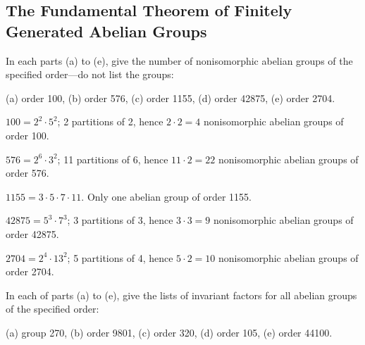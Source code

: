 \newpage

\subsection{The Fundamental Theorem of Finitely Generated Abelian Groups}

\begin{exercise}\label{ex5.2.1}
    In each parts (a) to (e), give the number of nonisomorphic abelian groups of the specified order---do not list the groups:

    \noindent (a) order 100, \quad (b) order 576, \quad (c) order 1155, \quad (d) order 42875, \quad (e) order 2704.
\end{exercise}

\begin{solalph}
    \item $100 = 2^2 \cdot 5^2$; 2 partitions of 2, hence $2 \cdot 2 = 4$ nonisomorphic abelian groups of order 100.
    \item $576 = 2^6 \cdot 3^2$; 11 partitions of 6, hence $11 \cdot 2 = 22$ nonisomorphic abelian groups of order 576.
    \item $1155 = 3 \cdot 5 \cdot 7 \cdot 11$. Only one abelian group of order 1155.
    \item $42875 = 5^3 \cdot 7^3$; 3 partitions of 3, hence $3 \cdot 3 = 9$ nonisomorphic abelian groups of order 42875.
    \item $2704 = 2^4 \cdot 13^2$; 5 partitions of 4, hence $5 \cdot 2 = 10$ nonisomorphic abelian groups of order 2704.
\end{solalph}

\begin{exercise}\label{ex5.2.2}
    In each of parts (a) to (e), give the lists of invariant factors for all abelian groups of the specified order:

    \noindent (a) group 270, \quad (b) order 9801, \quad (c) order 320, \quad (d) order 105, \quad (e) order 44100.
\end{exercise}

